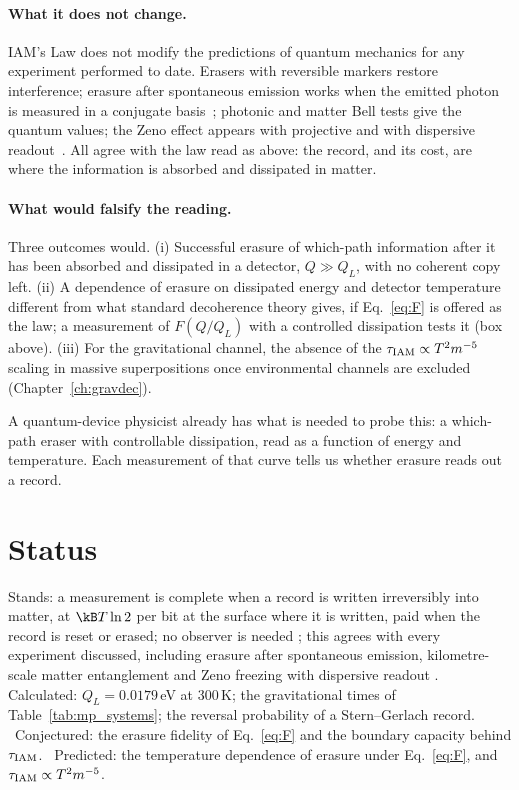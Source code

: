 \paragraph{What it does not change.} IAM's Law does not modify the predictions of quantum mechanics for any experiment performed to date. Erasers with
reversible markers restore interference; erasure after spontaneous emission works when the emitted photon is measured in a conjugate
basis~\cite{Blinov2004,Moehring2007,Hensen2015}; photonic and matter Bell tests give the quantum values; the Zeno effect appears with projective and with
dispersive readout~\cite{Itano1990,Slichter2016}. All agree with the law read as above: the record, and its cost, are where the information is absorbed and
dissipated in matter. \observed

\paragraph{What would falsify the reading.} Three outcomes would. (i) Successful erasure of which-path information after it has been absorbed and
dissipated in a detector, $Q\gg Q_L$, with no coherent copy left. (ii) A dependence of erasure on dissipated energy and detector temperature different
from what standard decoherence theory gives, if Eq.~\eqref{eq:F} is offered as the law; a measurement of $F(Q/Q_L)$ with a controlled dissipation tests
it (box above). (iii) For the gravitational channel, the absence of the $\tau_{\rm IAM}\propto T^2m^{-5}$ scaling in massive superpositions once
environmental channels are excluded (Chapter~\ref{ch:gravdec}). \prediction

A quantum-device physicist already has what is needed to probe this: a which-path eraser with controllable dissipation, read as a function of energy and temperature. Each measurement of that curve tells us whether erasure reads out a record.

\section{Status}\label{sec:mp_status}
Stands: a measurement is complete when a record is written irreversibly into matter, at $\kB T\ln2$ per bit at the surface where it is written, paid
when the record is reset or erased; no observer is needed \interp; this agrees with every experiment discussed, including erasure after spontaneous
emission, kilometre-scale matter entanglement and Zeno freezing with dispersive readout \observed. Calculated: $Q_L=0.0179$\,eV at 300\,K; the gravitational
times of Table~\ref{tab:mp_systems}; the reversal probability of a Stern--Gerlach record. \calc\ Conjectured: the erasure fidelity of Eq.~\eqref{eq:F}
and the boundary capacity behind $\tau_{\rm IAM}$. \conjecture\ Predicted: the temperature dependence of erasure under Eq.~\eqref{eq:F}, and
$\tau_{\rm IAM}\propto T^2m^{-5}$. \prediction
